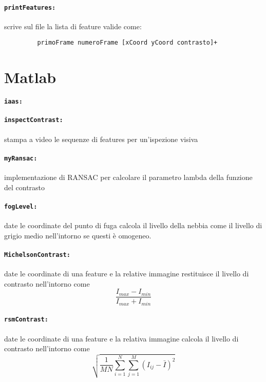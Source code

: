 \documentclass[12pt]{report}
\begin{document}
\paragraph*{\verb_printFeatures:_} scrive sul file la lista di feature valide come:
\begin{verbatim}
	     primoFrame numeroFrame [xCoord yCoord contrasto]+
\end{verbatim}

\section{Matlab}

\paragraph*{\verb_iaas:_}

\paragraph*{\verb_inspectContrast:_} stampa a video le sequenze di features per un'ispezione visiva

\paragraph*{\verb_myRansac:_} implementazione di RANSAC per calcolare il parametro lambda della funzione del contrasto







\paragraph*{\verb_fogLevel:_} date le coordinate del punto di fuga calcola il livello della nebbia come il livello di grigio medio nell'intorno se questi \`e omogeneo.

\paragraph*{\verb_MichelsonContrast:_} date le coordinate di una feature e la relative immagine restituisce il livello di contrasto nell'intorno come $$\frac{I_{max}-I_{min}}{I_{max}+I_{min}}$$

\paragraph*{\verb_rsmContrast:_} date le coordinate di una feature e la relativa immagine calcola il livello di contrasto nell'intorno come $$\sqrt{\frac{1}{MN}\sum_{i=1}^N\sum_{j=1}^M(I_{ij}-\bar{I})^2}$$
\end{document}
